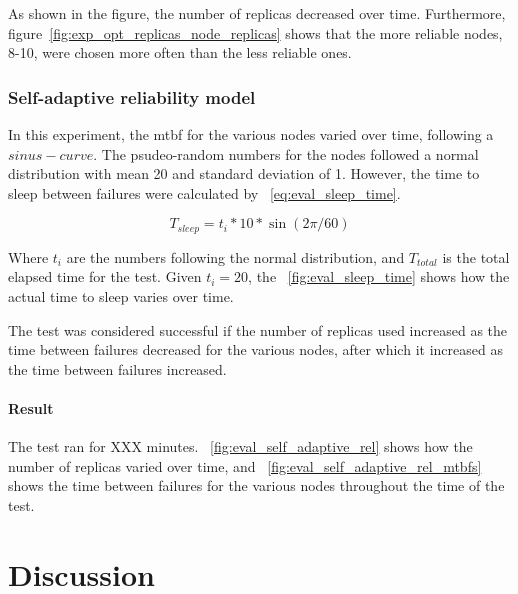 \documentclass{cslthse-msc}
\begin{document}
As shown in the figure, the number of replicas decreased over time. Furthermore, figure~\ref{fig:exp_opt_replicas_node_replicas} shows that the more reliable nodes, 8-10, were chosen more often than the less reliable ones.

\subsection{Self-adaptive reliability model} \label{sec:eval_adaptive_rel_model}
In this experiment, the mtbf for the various nodes varied over time, following a $sinus-curve$. The psudeo-random numbers for the nodes followed a normal distribution with mean 20 and standard deviation of 1. However, the time to sleep between failures were calculated by ~\ref{eq:eval_sleep_time}.

\begin{equation} \label{eq:eval_sleep_time}
T_{sleep} = t_i * 10 * \sin{(2\pi / 60)}
\end{equation}

Where $t_i$ are the numbers following the normal distribution, and $T_{total}$ is the total elapsed time for the test. Given $t_i=20$, the ~\autoref{fig:eval_sleep_time} shows how the actual time to sleep varies over time.

The test was considered successful if the number of replicas used increased as the time between failures decreased for the various nodes, after which it increased as the time between failures increased.

\subsubsection*{Result}
The test ran for XXX minutes. ~\autoref{fig:eval_self_adaptive_rel} shows how the number of replicas varied over time, and ~\autoref{fig:eval_self_adaptive_rel_mtbfs} shows the time between failures for the various nodes throughout the time of the test.


\chapter{Discussion} \label{ch:discussion}

\end{document}
